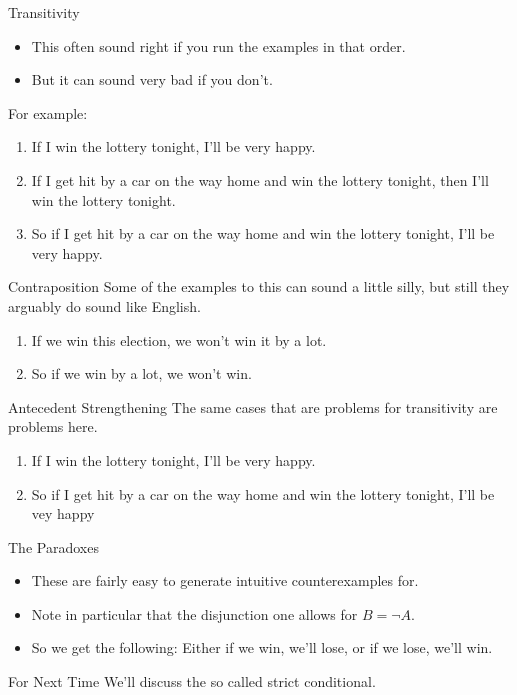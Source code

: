 \documentclass[
  ignorenonframetext,
]{beamer}
\providecommand{\tightlist}{%
  \setlength{\itemsep}{0pt}\setlength{\parskip}{0pt}}
\renewcommand{\,}{\text{, }}
\begin{document}
\begin{frame}{Transitivity}
\protect\hypertarget{transitivity}{}
\begin{itemize}
\tightlist
\item
  This often sound right if you run the examples in that order.
\item
  But it can sound very bad if you don't.
\end{itemize}

For example:

\begin{enumerate}
\tightlist
\item
  If I win the lottery tonight, I'll be very happy.
\item
  If I get hit by a car on the way home and win the lottery tonight,
  then I'll win the lottery tonight.
\item
  So if I get hit by a car on the way home and win the lottery tonight,
  I'll be very happy.
\end{enumerate}
\end{frame}

\begin{frame}{Contraposition}
\protect\hypertarget{contraposition}{}
Some of the examples to this can sound a little silly, but still they
arguably do sound like English.

\begin{enumerate}
\tightlist
\item
  If we win this election, we won't win it by a lot.
\item
  So if we win by a lot, we won't win.
\end{enumerate}
\end{frame}

\begin{frame}{Antecedent Strengthening}
\protect\hypertarget{antecedent-strengthening}{}
The same cases that are problems for transitivity are problems here.

\begin{enumerate}
\tightlist
\item
  If I win the lottery tonight, I'll be very happy.
\item
  So if I get hit by a car on the way home and win the lottery tonight,
  I'll be vey happy
\end{enumerate}
\end{frame}

\begin{frame}{The Paradoxes}
\protect\hypertarget{the-paradoxes}{}
\begin{itemize}
\tightlist
\item
  These are fairly easy to generate intuitive counterexamples for.
\item
  Note in particular that the disjunction one allows for \(B = \neg A\).
\item
  So we get the following: Either if we win, we'll lose, or if we lose,
  we'll win.
\end{itemize}
\end{frame}

\begin{frame}{For Next Time}
\protect\hypertarget{for-next-time}{}
We'll discuss the so called strict conditional.
\end{frame}
\end{document}
